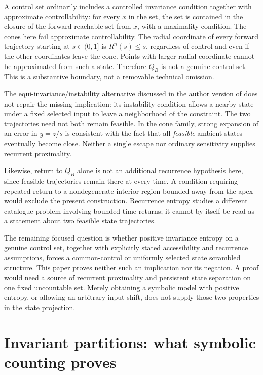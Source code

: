 \documentclass[11pt,a4paper]{article}
\theoremstyle{definition}
\theoremstyle{remark}
\begin{document}
A control set ordinarily includes a controlled invariance condition together with approximate controllability: for every \(x\) in the set, the set is contained in the closure of the forward reachable set from \(x\), with a maximality condition. The cones here fail approximate controllability. The radial coordinate of every forward trajectory starting at \(s\in(0,1]\) is \(R^n(s)\leq s\), regardless of control and even if the other coordinates leave the cone. Points with larger radial coordinate cannot be approximated from such a state. Therefore \(Q_B\) is not a genuine control set. This is a substantive boundary, not a removable technical omission.

The equi-invariance/instability alternative discussed in the author version of \cite[Definition 3.3 and Theorem 3.4]{ZCH2021} does not repair the missing implication: its instability condition allows a nearby state under a fixed selected input to leave a neighborhood of the constraint. The two trajectories need not both remain feasible. In the cone family, strong expansion of an error in \(y=z/s\) is consistent with the fact that all \emph{feasible} ambient states eventually become close. Neither a single escape nor ordinary sensitivity supplies recurrent proximality.

Likewise, return to \(Q_B\) alone is not an additional recurrence hypothesis here, since feasible trajectories remain there at every time. A condition requiring repeated return to a nondegenerate interior region bounded away from the apex would exclude the present construction. Recurrence entropy \cite{SM2026} studies a different catalogue problem involving bounded-time returns; it cannot by itself be read as a statement about two feasible state trajectories.

The remaining focused question is whether positive invariance entropy on a genuine control set, together with explicitly stated accessibility and recurrence assumptions, forces a common-control or uniformly selected state scrambled structure. This paper proves neither such an implication nor its negation. A proof would need a source of recurrent proximality and persistent state separation on one fixed uncountable set. Merely obtaining a symbolic model with positive entropy, or allowing an arbitrary input shift, does not supply those two properties in the state projection.

\appendix
\section{Invariant partitions: what symbolic counting proves}\label{app:partition}
\end{document}
